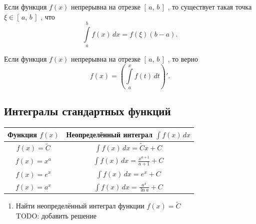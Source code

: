 \documentclass[12pt]{article}
\begin{document}
 Если функция $f(x)$ непрерывна на отрезке 
$[\,a,\, b\,]$ , то существует такая точка $\xi \in [\,a,\, b\,]$ , что
\[\int\limits_a^b f(x) \, dx = f(\xi)(b - a).\]

 Если функция $f(x)$ непрерывна 
на отрезке $[\,a,\, b\,]$ , то верно
\[f(x) = \left(\int\limits_{a}^{x}f(t)\,dt\right)'.\]

\subsection{\hywenhei Интегралы стандартных функций}

\renewcommand{\arraystretch}{3}
\setlength{\tabcolsep}{50pt}
\begin{longtable}{|c|c|}
	\hline
Функция $f(x)$ 
& 
Неопределённый интеграл $\displaystyle \int f(x) \, dx$ \\
\hline
$\displaystyle f(x) = \tilde{C}$ 
&
$\displaystyle \int f(x) \, dx = \tilde{C}x + C$ \\
\hline
$\displaystyle f(x) = x^a$ 
&
$\displaystyle \int f(x) \, dx = \frac{x^{a+1}}{a+1} + C$ \\
\hline
$\displaystyle f(x) = e^x$
&
$\displaystyle \int f(x) \, dx = e^x + C$ \\
\hline
$\displaystyle f(x) = a^x$
&
$\displaystyle \int f(x) \, dx = \frac{a^x}{\ln{a}} + C$ \\
\hline
\end{longtable}

\begin{enumerate}
\item {\hywenhei Найти неопределённый интеграл функции $f(x) = \tilde{C}$} \\
TODO: добавить решение
\end{enumerate}
\end{document}
